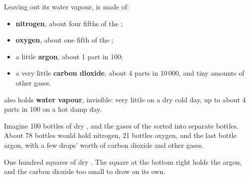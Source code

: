 \begin{proposition}\label{prop:g4:air-a-mixture-of-gases:composition}
Leaving out its water vapour,  is made of:
\begin{itemize}
  \item \textbf{nitrogen}, about four fifths of the ;
  \item \textbf{oxygen}, about one fifth of the ;
  \item a little \textbf{argon}, about 1 part in 100;
  \item a very little \textbf{carbon dioxide}, about 4 parts in 10\,000,
        and tiny amounts of other gases.
\end{itemize}
 also holds \textbf{water vapour}, invisible: very little on a dry
cold day, up to about 4 parts in 100 on a hot damp day.
\end{proposition}

\begin{example}\label{ex:g4:air-a-mixture-of-gases:hundred}
Imagine 100 bottles of dry , and the gases of the  sorted into
separate bottles. About 78 bottles would hold nitrogen, 21 bottles
oxygen, and the last bottle argon, with a few drops' worth of carbon
dioxide and other gases.
\end{example}

\begin{omfigure}

{\small One hundred squares of dry . The square at the bottom right
holds the argon, and the carbon dioxide too small to draw on its own.}
\end{omfigure}

